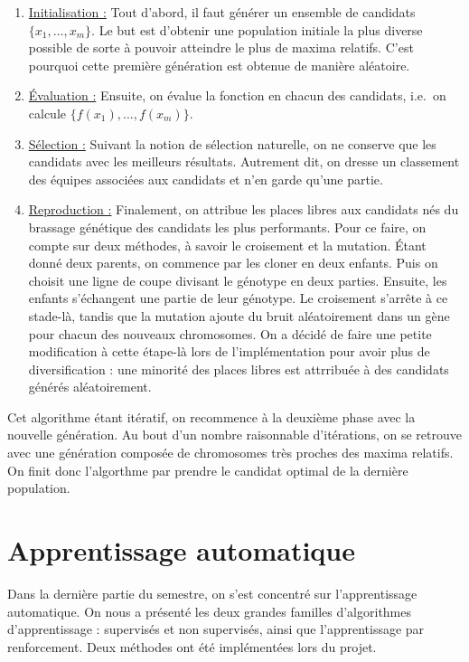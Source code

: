 \documentclass[12pt,a4paper]{article}
\begin{document}
\begin{enumerate}
\item \underline{Initialisation :} Tout d'abord, il faut g\'en\'erer un 
ensemble de candidats $\{x_1,\dotsc,x_m\}$. Le but est d'obtenir une population 
initiale la plus diverse possible de sorte \`a pouvoir atteindre le plus de 
maxima relatifs. C'est pourquoi cette premi\`ere g\'en\'eration est obtenue de 
mani\`ere al\'eatoire.
\item \underline{\'Evaluation :} Ensuite, on \'evalue la fonction en 
chacun des candidats, i.e.\ on calcule $\{f(x_1),\dotsc,f(x_m)\}$.
\item \underline{S\'election :} Suivant la notion de s\'election 
naturelle, on ne conserve que les candidats avec les meilleurs r\'esultats. 
Autrement dit, on dresse un classement des \'equipes associ\'ees aux candidats 
et n'en garde qu'une partie.
\item \underline{Reproduction :} Finalement, on attribue les places 
libres aux candidats n\'es du brassage g\'en\'etique des candidats les 
plus performants. Pour ce faire, on compte sur deux m\'ethodes, \`a savoir le 
croisement et la mutation. \'Etant donn\'e deux parents, on commence par les 
cloner en deux enfants. Puis on choisit une ligne de coupe divisant le 
g\'enotype en deux parties. Ensuite, les enfants s'\'echangent une partie de 
leur g\'enotype. Le croisement s'arr\^ete \`a ce stade-l\`a, tandis que la 
mutation ajoute du bruit al\'eatoirement dans un g\`ene pour chacun 
des nouveaux chromosomes. On a d\'ecid\'e de faire une petite modification \`a 
cette \'etape-l\`a lors de l'impl\'ementation pour avoir plus de 
diversification : une minorit\'e des places libres est attrribu\'ee \`a des 
candidats g\'en\'er\'es al\'eatoirement.
\end{enumerate}

Cet algorithme \'etant it\'eratif, on recommence \`a la deuxi\`eme phase avec 
la nouvelle g\'en\'eration. Au bout d'un nombre raisonnable d'it\'erations, on 
se retrouve avec une g\'en\'eration compos\'ee de chromosomes tr\`es 
proches des maxima relatifs. On finit donc l'algorthme par prendre le candidat 
optimal de la derni\`ere population.  

\section{Apprentissage automatique}
Dans la derni\`ere partie du semestre, on s'est concentr\'e sur l'apprentissage 
automatique. On nous a pr\'esent\'e les deux grandes familles 
d'algorithmes d'apprentissage : supervis\'es et non supervis\'es, ainsi que 
l'apprentissage par renforcement. Deux m\'ethodes ont \'et\'e impl\'ement\'ees 
lors du projet.
\end{document}
